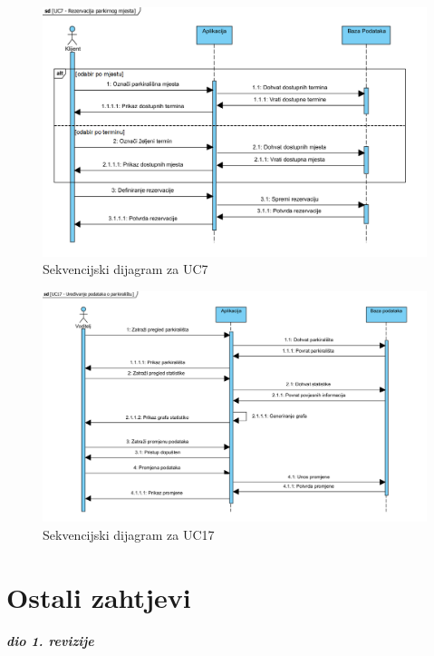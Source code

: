 				\begin{figure}[H]
					\centering
					\includegraphics[width=\textwidth]{slike/SD_UC7.JPG} 
					\caption{Sekvencijski dijagram za UC7}
					\label{fig:promjene10} 
				\end{figure}
				
				\begin{figure}[H]
					\centering
					\includegraphics[width=\textwidth]{slike/SD_UC17.JPG} 
					\caption{Sekvencijski dijagram za UC17}
					\label{fig:promjene11} 
				\end{figure}
				\eject
	
		\section{Ostali zahtjevi}
		
			\textbf{\textit{dio 1. revizije}}\\
		 
